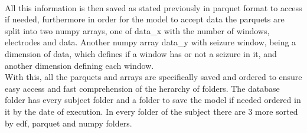 \\
All this information is then saved as stated previously in parquet format to access if needed, furthermore in order for the model to accept data the parquets are split into two numpy arrays, one of data\_x with the number of windows, electrodes and data. Another numpy array data\_y with seizure window, being a dimension of data, which defines if a window has or not a seizure in it, and another dimension defining each window.
\\
With this, all the parquets and arrays are specifically saved and ordered to ensure easy access and fast comprehension of the herarchy of folders. The database folder has every subject folder and a folder to save the model if needed ordered in it by the date of execution. In every folder of the subject there are 3 more sorted by edf, parquet and numpy folders.
\\
\leavevmode\\
